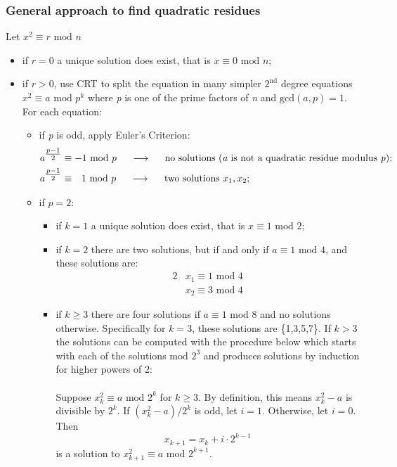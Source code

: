 \documentclass[11pt, a4paper]{article}
\newcommand{\consegue}{\hspace{0.5cm}\longrightarrow\hspace{0.5cm}}
\newcommand{\mymod}{
    \text{ mod }
}
\begin{document}
\subsubsection{General approach to find quadratic residues}
Let $x^2\equiv r\mymod n$
\begin{itemize}
    \item if $r=0$ a unique solution does exist, that is $x\equiv0\mymod n$;
    \item if $r>0$, use CRT to split the equation in many simpler $2^{\text{nd}}$ degree equations $x^2\equiv a \mymod p^k$ where \textit{p} is one of the prime factors of \textit{n} and $\text{gcd}(a,p)=1$. For each equation:
    \begin{itemize}
        \item if \textit{p} is odd, apply Euler's Criterion:
        \begin{alignat*}{2}
            & a^{\tfrac{p-1}{2}}\equiv -1\mymod p\consegue\text{no solutions (\textit{a} is not a quadratic residue modulus \textit{p})};\\
            & a^{\tfrac{p-1}{2}}\equiv\;\;\, 1\mymod p\consegue\text{two solutions } x_1,x_2;
        \end{alignat*}
        \item if $p=2$:
        \begin{itemize}
            \item if $k=1$ a unique solution does exist, that is $x\equiv1\mymod2$;
            \item if $k=2$ there are two solutions, but if and only if $a\equiv1\mymod4$, and these solutions are:
            \begin{alignat*}{2}
                &x_1\equiv1\mymod4\\
                &x_2\equiv3\mymod4
            \end{alignat*}
            \item if $k\ge3$ there are four solutions if $a\equiv1\mymod8$ and no solutions otherwise. Specifically for $k=3$, these solutions are \{1,3,5,7\}. If $k>3$ the solutions can be computed with the procedure below which starts with each of the solutions$\mymod2^3$ and produces solutions by induction for higher powers of 2:\\\\
            Suppose $x_k^2\equiv a\mymod2^k$ for $k\ge3$. By definition, this means $x_k^2-a$ is divisible by $2^k$. If $(x_k^2-a)/2^k$ is odd, let $i=1$. Otherwise, let $i=0$. Then
            $$x_{k+1}=x_k+i\cdot2^{k-1}$$
            is a solution to $x_{k+1}^2\equiv a\mymod2^{k+1}$.\\\\

\end{itemize}
\end{itemize}
\end{itemize}
\end{document}
